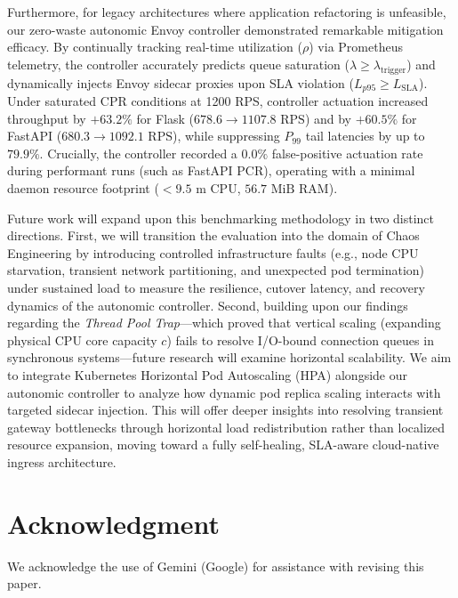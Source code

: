 \documentclass{ieeeaccess}
\begin{document}
	Furthermore, for legacy architectures where application refactoring is unfeasible, our zero-waste autonomic Envoy controller demonstrated remarkable mitigation efficacy. By continually tracking real-time utilization ($\rho$) via Prometheus telemetry, the controller accurately predicts queue saturation ($\lambda \ge \lambda_{\text{trigger}}$) and dynamically injects Envoy sidecar proxies upon SLA violation ($L_{p95} \ge L_{\text{SLA}}$). Under saturated CPR conditions at 1200 RPS, controller actuation increased throughput by $+63.2\%$ for Flask ($678.6 \to 1107.8\text{ RPS}$) and by $+60.5\%$ for FastAPI ($680.3 \to 1092.1\text{ RPS}$), while suppressing $P_{99}$ tail latencies by up to $79.9\%$. Crucially, the controller recorded a $0.0\%$ false-positive actuation rate during performant runs (such as FastAPI PCR), operating with a minimal daemon resource footprint ($< 9.5\text{ m}$ CPU, $56.7\text{ MiB}$ RAM). 
	
	Future work will expand upon this benchmarking methodology in two distinct directions. First, we will transition the evaluation into the domain of Chaos Engineering by introducing controlled infrastructure faults (e.g., node CPU starvation, transient network partitioning, and unexpected pod termination) under sustained load to measure the resilience, cutover latency, and recovery dynamics of the autonomic controller. Second, building upon our findings regarding the \textit{Thread Pool Trap}—which proved that vertical scaling (expanding physical CPU core capacity $c$) fails to resolve I/O-bound connection queues in synchronous systems—future research will examine horizontal scalability. We aim to integrate Kubernetes Horizontal Pod Autoscaling (HPA) alongside our autonomic controller to analyze how dynamic pod replica scaling interacts with targeted sidecar injection. This will offer deeper insights into resolving transient gateway bottlenecks through horizontal load redistribution rather than localized resource expansion, moving toward a fully self-healing, SLA-aware cloud-native ingress architecture.
	
	
	
	
	\section*{Acknowledgment}
	
	We acknowledge the use of Gemini (Google) for assistance with revising this paper.
	
\end{document}
